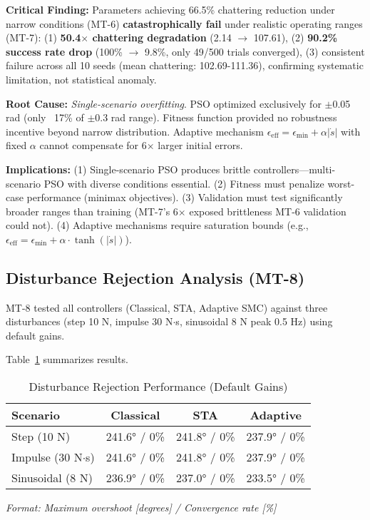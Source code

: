 \documentclass[conference]{IEEEtran}
\begin{document}
\textbf{Critical Finding:} Parameters achieving 66.5\% chattering reduction under narrow conditions (MT-6) \textbf{catastrophically fail} under realistic operating ranges (MT-7): (1) \textbf{50.4$\times$ chattering degradation} (2.14 $\rightarrow$ 107.61), (2) \textbf{90.2\% success rate drop} (100\% $\rightarrow$ 9.8\%, only 49/500 trials converged), (3) consistent failure across all 10 seeds (mean chattering: 102.69-111.36), confirming systematic limitation, not statistical anomaly.

\textbf{Root Cause:} \emph{Single-scenario overfitting}. PSO optimized exclusively for $\pm$0.05 rad (only ~17\% of $\pm$0.3 rad range). Fitness function provided no robustness incentive beyond narrow distribution. Adaptive mechanism $\epsilon_{\text{eff}} = \epsilon_{\min} + \alpha|\dot{s}|$ with fixed $\alpha$ cannot compensate for 6$\times$ larger initial errors.

\textbf{Implications:} (1) Single-scenario PSO produces brittle controllers—multi-scenario PSO with diverse conditions essential. (2) Fitness must penalize worst-case performance (minimax objectives). (3) Validation must test significantly broader ranges than training (MT-7's 6$\times$ exposed brittleness MT-6 validation could not). (4) Adaptive mechanisms require saturation bounds (e.g., $\epsilon_{\text{eff}} = \epsilon_{\min} + \alpha \cdot \tanh(|\dot{s}|)$).

\subsection{Disturbance Rejection Analysis (MT-8)}

MT-8 tested all controllers (Classical, STA, Adaptive SMC) against three disturbances (step 10 N, impulse 30 N$\cdot$s, sinusoidal 8 N peak 0.5 Hz) using default gains.

Table~\ref{tab:mt8} summarizes results.

\begin{table}[!t]
\caption{Disturbance Rejection Performance (Default Gains)}
\label{tab:mt8}
\centering
\small
\begin{tabular}{@{}lccc@{}}
\toprule
\textbf{Scenario} & \textbf{Classical} & \textbf{STA} & \textbf{Adaptive} \\
\midrule
Step (10 N) & 241.6° / 0\% & 241.8° / 0\% & 237.9° / 0\% \\
Impulse (30 N$\cdot$s) & 241.6° / 0\% & 241.8° / 0\% & 237.9° / 0\% \\
Sinusoidal (8 N) & 236.9° / 0\% & 237.0° / 0\% & 233.5° / 0\% \\
\bottomrule
\end{tabular}
\end{table}
\textit{Format: Maximum overshoot [degrees] / Convergence rate [\%]}
\end{document}
